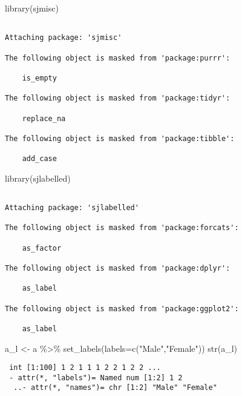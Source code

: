 \documentclass[
  letterpaper,
  DIV=11,
  numbers=noendperiod]{scrreprt}
\newenvironment{Shaded}{\begin{snugshade}}{\end{snugshade}}
\newcommand{\AttributeTok}[1]{\textcolor[rgb]{0.40,0.45,0.13}{#1}}
\newcommand{\FunctionTok}[1]{\textcolor[rgb]{0.28,0.35,0.67}{#1}}
\newcommand{\NormalTok}[1]{\textcolor[rgb]{0.00,0.23,0.31}{#1}}
\newcommand{\OtherTok}[1]{\textcolor[rgb]{0.00,0.23,0.31}{#1}}
\newcommand{\SpecialCharTok}[1]{\textcolor[rgb]{0.37,0.37,0.37}{#1}}
\newcommand{\StringTok}[1]{\textcolor[rgb]{0.13,0.47,0.30}{#1}}
\begin{document}
\begin{Shaded}
\begin{Highlighting}[]
\FunctionTok{library}\NormalTok{(sjmisc)}
\end{Highlighting}
\end{Shaded}

\begin{verbatim}

Attaching package: 'sjmisc'

The following object is masked from 'package:purrr':

    is_empty

The following object is masked from 'package:tidyr':

    replace_na

The following object is masked from 'package:tibble':

    add_case
\end{verbatim}

\begin{Shaded}
\begin{Highlighting}[]
\FunctionTok{library}\NormalTok{(sjlabelled)}
\end{Highlighting}
\end{Shaded}

\begin{verbatim}

Attaching package: 'sjlabelled'

The following object is masked from 'package:forcats':

    as_factor

The following object is masked from 'package:dplyr':

    as_label

The following object is masked from 'package:ggplot2':

    as_label
\end{verbatim}

\begin{Shaded}
\begin{Highlighting}[]
\NormalTok{a\_l }\OtherTok{\textless{}{-}}\NormalTok{ a }\SpecialCharTok{\%\textgreater{}\%}
  \FunctionTok{set\_labels}\NormalTok{(}\AttributeTok{labels=}\FunctionTok{c}\NormalTok{(}\StringTok{"Male"}\NormalTok{,}\StringTok{"Female"}\NormalTok{))}
\FunctionTok{str}\NormalTok{(a\_l)}
\end{Highlighting}
\end{Shaded}

\begin{verbatim}
 int [1:100] 1 2 1 1 1 2 2 1 2 2 ...
 - attr(*, "labels")= Named num [1:2] 1 2
  ..- attr(*, "names")= chr [1:2] "Male" "Female"
\end{verbatim}
\end{document}
